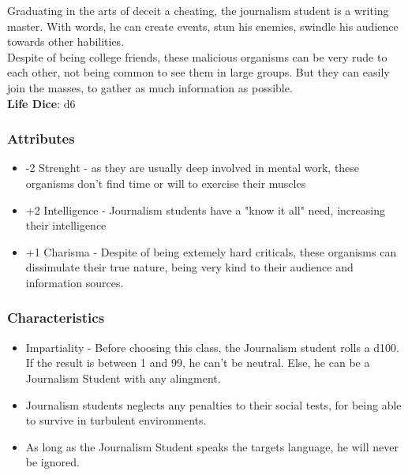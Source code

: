 \documentclass[ letterpaper,12pt]{article}
\begin{document}
Graduating in the arts of deceit a cheating, the journalism student is a writing master. With words, he can create events, stun his enemies, swindle his audience towards other habilities.\\
Despite of being college friends, these malicious organisms can be very rude to each other, not being common to see them in large groups. But they can easily join the masses, to gather as much information as possible.\\

{\bf Life Dice}: d6


\subsubsection{Attributes}
\begin{itemize}
\item{-2 Strenght - as they are usually deep involved in mental work, these organisms don't find time or will to exercise their muscles}
\item{+2 Intelligence - Journalism students have a "know it all" need, increasing their intelligence}
\item{+1 Charisma - Despite of being extemely hard criticals, these organisms can dissimulate their true nature, being very kind to their audience and information sources.}
\end{itemize}

\subsubsection{Characteristics}

\begin{itemize}
\item{Impartiality - Before choosing this class, the Journalism student rolls a d100. If the result is between 1 and 99, he can't be neutral. Else, he can be a Journalism Student with any alingment.}
\item{Journalism students neglects any penalties to their social tests, for being able to survive in turbulent environments.}
\item{As long as the Journalism Student speaks the targets language, he will never be ignored.}
\end{itemize}
\end{document}
